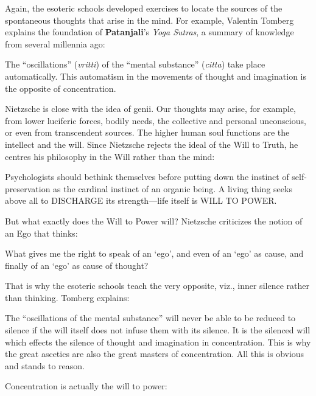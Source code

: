 Again, the esoteric schools developed exercises to locate the sources of the spontaneous thoughts that arise in the mind. For example, Valentin Tomberg explains the foundation of \textbf{Patanjali}'s \emph{Yoga Sutras}, a summary of knowledge from several millennia ago:

\begin{quotex}
The ``oscillations'' (\emph{vritti}) of the ``mental substance'' (\emph{citta}) take place automatically. This automatism in the movements of thought and imagination is the opposite of concentration.
\end{quotex}


Nietzsche is close with the idea of genii. Our thoughts may arise, for example, from lower luciferic forces, bodily needs, the collective and personal unconscious, or even from transcendent sources. The higher human soul functions are the intellect and the will. Since Nietzsche rejects the ideal of the Will to Truth, he centres his philosophy in the Will rather than the mind:

\begin{quotex}
Psychologists should bethink themselves before putting down the instinct of self-preservation as the cardinal instinct of an organic being. A living thing seeks above all to DISCHARGE its strength---life itself is WILL TO POWER.
\end{quotex}


But what exactly does the Will to Power will? Nietzsche criticizes the notion of an Ego that thinks:

\begin{quotex}
What gives me the right to speak of an `ego', and even of an `ego' as cause, and finally of an `ego' as cause of thought?
\end{quotex}


That is why the esoteric schools teach the very opposite, viz., inner silence rather than thinking. Tomberg explains:

\begin{quotex}
The ``oscillations of the mental substance'' will never be able to be reduced to silence if the will itself does not infuse them with its silence. It is the silenced will which effects the silence of thought and imagination in concentration. This is why the great ascetics are also the great masters of concentration. All this is obvious and stands to reason.
\end{quotex}


Concentration is actually the will to power:

